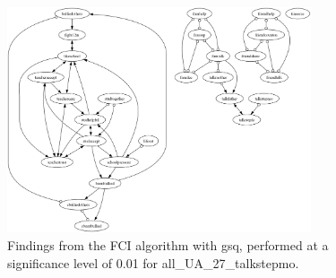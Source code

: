 \begin{figure}[htbp]
    \centering
    \includegraphics[width=0.8\textwidth]{Report/final_report/pictures/FCI_gsq_0.01_all_UA_27_talkstepmo.png}
    \caption{Findings from the FCI algorithm with gsq, performed at a significance level of 0.01 for all_UA_27_talkstepmo.}
    \label{fig:fci_gsq_0.01all_UA_27_talkstepmo}
\end{figure}
